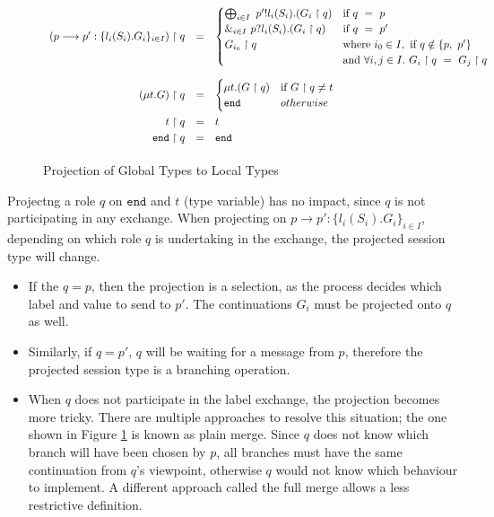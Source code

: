 \documentclass[12pt,twoside]{report}
\begin{document}
\begin{figure}[h]
    \centering
    \begin{equation*}
    \centering
    \begin{array}{rcl}
        
        (p \longrightarrow p':\{l_i(S_i).G_i\}_{i \in I}) \upharpoonright q & = &
        \begin{cases}
            \bigoplus_{i \in I}\ p'!l_i(S_i).(G_i \upharpoonright q) & \text{if}\ q\ =\ p\\
            \&_{i \in I}\ p?l_i(S_i).(G_i \upharpoonright q) & \text{if}\ q\ =\ p'\\
            G_{i_0} \upharpoonright q & \text{where}\ i_0 \in I,\ \text{if}\ q \notin \{p,\ p'\}\\
            & \text{and}\ \forall i,j \in I.\ G_i \upharpoonright q\ =\ G_j \upharpoonright q
        \end{cases}\\[33pt]
        (\mu t.G) \upharpoonright q & = & 
        \begin{cases}
            \mu t.(G \upharpoonright q) & \text{if}\ G \upharpoonright q \neq t\\
            \texttt{end} & otherwise
        \end{cases}\\[13pt]
        t \upharpoonright q & = & t\\[2.75pt]
        \texttt{end} \upharpoonright q & = & \texttt{end}\\[2.75pt]
        \end{array}
    \end{equation*}
    \caption{Projection of Global Types to Local Types}
    \label{MPST_projection}
\end{figure}{}

Projectng a role $q$ on $\texttt{end}$ and $t$ (type variable) has no impact, since $q$ is not participating in any exchange. When projecting on $p \longrightarrow p':\{l_i(S_i).G_i\}_{i \in I}$, depending on which role $q$ is undertaking in the exchange, the projected session type will change. 
\begin{itemize}
    \item If the $q = p$, then the projection is a selection, as the process decides which label and value to send to $p'$. The continuations $G_i$ must be projected onto $q$ as well.
    \item Similarly, if $q = p'$, $q$ will be waiting for a message from $p$, therefore the projected session type is a branching operation. 
    \item  When $q$ does not participate in the label exchange, the projection becomes more tricky. There are multiple approaches to resolve this situation; the one shown in Figure \ref{MPST_projection} is known as plain merge. Since $q$ does not know which branch will have been chosen by $p$, all branches must have the same continuation from $q$'s viewpoint, otherwise $q$ would not know which behaviour to implement. A different approach called the full merge allows a less restrictive definition\cite{verygentleintrotompst}.
    
\end{itemize}
\end{document}
